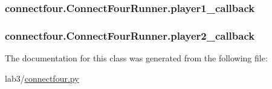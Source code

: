 \subsubsection[{player1\+\_\+callback}]{\setlength{\rightskip}{0pt plus 5cm}connectfour.\+Connect\+Four\+Runner.\+player1\+\_\+callback}\label{classconnectfour_1_1_connect_four_runner_a1f7cbaa7df8b4dd89aa596acb4977109}
\hypertarget{classconnectfour_1_1_connect_four_runner_a5b19a63b068583b57e75e425dbe0fcde}{}
\subsubsection[{player2\+\_\+callback}]{\setlength{\rightskip}{0pt plus 5cm}connectfour.\+Connect\+Four\+Runner.\+player2\+\_\+callback}\label{classconnectfour_1_1_connect_four_runner_a5b19a63b068583b57e75e425dbe0fcde}


The documentation for this class was generated from the following file\+:\begin{DoxyCompactItemize}
\item 
lab3/\hyperlink{connectfour_8py}{connectfour.\+py}\end{DoxyCompactItemize}
